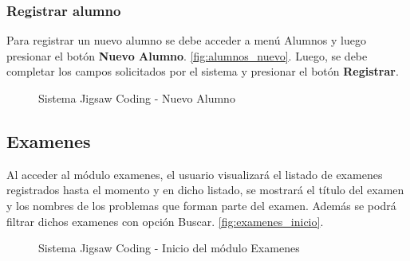 \subsubsection{Registrar alumno}

Para registrar un nuevo alumno se debe acceder a menú Alumnos y luego presionar el botón \textbf{Nuevo Alumno}. \autoref{fig:alumnos_nuevo}. Luego, se debe completar los campos solicitados por el sistema y presionar el botón \textbf{Registrar}.

\begin{figure}
	\centering
	\caption[SJC Nuevo alumno]{Sistema Jigsaw Coding - Nuevo Alumno}
	\label{fig:alumnos_nuevo}
\end{figure}

\subsection{Examenes}
Al acceder al módulo examenes, el usuario visualizará el listado de examenes registrados hasta el momento y en dicho listado, se mostrará el título del examen y los nombres de los problemas que forman parte del examen. Además se podrá filtrar dichos examenes con opción Buscar. \autoref{fig:examenes_inicio}.

\begin{figure}
	\centering
	\caption[SJC Examenes]{Sistema Jigsaw Coding - Inicio del módulo Examenes}
	\label{fig:examenes_inicio}
\end{figure}
